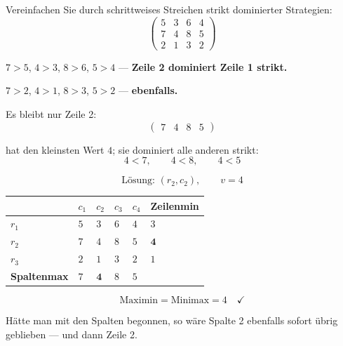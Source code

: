 \begin{aufgabe}
Vereinfachen Sie durch schrittweises Streichen strikt dominierter Strategien:
\[ \begin{pmatrix} 5 & 3 & 6 & 4\\ 7 & 4 & 8 & 5\\ 2 & 1 & 3 & 2 \end{pmatrix} \]

\loesung
{}
 $7>5$, $4>3$, $8>6$, $5>4$ --- \textbf{Zeile 2 dominiert Zeile 1 strikt.}

 $7>2$, $4>1$, $8>3$, $5>2$ --- \textbf{ebenfalls.}

Es bleibt nur Zeile 2:
\[ \begin{pmatrix} 7 & 4 & 8 & 5 \end{pmatrix} \]

 hat den kleinsten Wert $4$; sie dominiert alle anderen strikt:
\[ 4 < 7, \qquad 4 < 8, \qquad 4 < 5 \]

\[ \text{Lösung: } (r_2,c_2), \qquad v = 4 \]

\begin{center}
\renewcommand{\arraystretch}{1.46}
\begin{tabular}{@{}P{2.2cm}P{0.85cm}P{0.85cm}P{0.85cm}P{0.85cm}P{1.9cm}@{}}
\toprule
& $c_1$ & $c_2$ & $c_3$ & $c_4$ & \textbf{Zeilenmin}\\
\midrule
$r_1$ & $5$ & $3$ & $6$ & $4$ & $3$\\
$r_2$ & $7$ & $4$ & $8$ & $5$ & $\mathbf{4}$\\
$r_3$ & $2$ & $1$ & $3$ & $2$ & $1$\\
\midrule
\textbf{Spaltenmax} & $7$ & $\mathbf{4}$ & $8$ & $5$ & \\
\bottomrule
\end{tabular}
\end{center}

\[ \text{Maximin} = \text{Minimax} = 4 \quad \checkmark \]

Hätte man mit den Spalten begonnen, so wäre Spalte 2 ebenfalls sofort übrig geblieben --- und dann Zeile 2.

\begin{center}
\begin{minipage}{0.88\textwidth}
\end{minipage}
\end{center}
\end{aufgabe}

